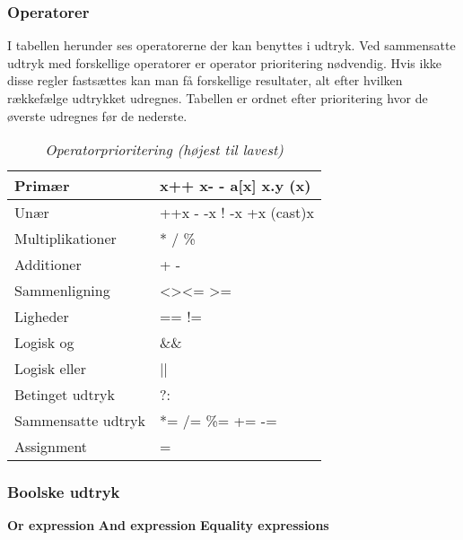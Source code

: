 \subsubsection{Operatorer}
I tabellen herunder ses operatorerne der kan benyttes i udtryk. Ved sammensatte udtryk med forskellige operatorer er operator prioritering nødvendig. Hvis ikke disse regler fastsættes kan man få forskellige resultater, alt efter hvilken rækkefælge udtrykket udregnes. Tabellen er ordnet efter prioritering hvor de øverste udregnes før de nederste. 
\begin{table}[H]
    \centering
    \begin{tabular}{|l|l|}
        \hline
        \centering

        Primær             & x++ \quad x- - \quad a{[}x{]} \quad x.y \quad (x)                 \\ \hline
        Unær               & ++x \quad - -x \quad ! \quad -x \quad +x \quad (cast)x       \\ \hline
        Multiplikationer   & * \quad / \quad \%                                               \\ \hline
        Additioner         & + \quad -                                                        \\ \hline
        Sammenligning      & \textless \quad \textgreater \quad \textless= \quad\textgreater= \\ \hline
        Ligheder           & == \quad !=                                                      \\ \hline
        Logisk og          & \&\&                                                              \\ \hline
        Logisk eller       & ||                                                               \\ \hline
        Betinget udtryk    & ?:                                                               \\ \hline
        Sammensatte udtryk & *= \quad /= \quad \%= \quad += \quad -=                          \\ \hline
        Assignment         & =                                                                \\ \hline

    \end{tabular}
    \caption{\textit{Operatorprioritering (højest til lavest)}}
    \label{tab:operatorprioritering}
\end{table}
\subsubsection{Boolske udtryk}
\textbf{Or expression}
\textbf{And expression}
\textbf{Equality expressions}

